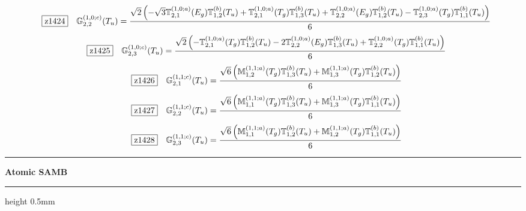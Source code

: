 \documentclass[fleqn,10pt,landscape]{jsarticle}
\begin{document}
\begin{dmath*}
\hspace*{3mm}\fbox{z1424}\quad \mathbb{G}_{2,2}^{(1,0;c)}(T_{u})=\frac{\sqrt{2} \left(- \sqrt{3} \mathbb{T}_{2,1}^{(1,0;a)}(E_{g}) \mathbb{T}_{1,2}^{(b)}(T_{u}) + \mathbb{T}_{2,1}^{(1,0;a)}(T_{g}) \mathbb{T}_{1,3}^{(b)}(T_{u}) + \mathbb{T}_{2,2}^{(1,0;a)}(E_{g}) \mathbb{T}_{1,2}^{(b)}(T_{u}) - \mathbb{T}_{2,3}^{(1,0;a)}(T_{g}) \mathbb{T}_{1,1}^{(b)}(T_{u})\right)}{6}
\end{dmath*}
\begin{dmath*}
\hspace*{3mm}\fbox{z1425}\quad \mathbb{G}_{2,3}^{(1,0;c)}(T_{u})=\frac{\sqrt{2} \left(- \mathbb{T}_{2,1}^{(1,0;a)}(T_{g}) \mathbb{T}_{1,2}^{(b)}(T_{u}) - 2 \mathbb{T}_{2,2}^{(1,0;a)}(E_{g}) \mathbb{T}_{1,3}^{(b)}(T_{u}) + \mathbb{T}_{2,2}^{(1,0;a)}(T_{g}) \mathbb{T}_{1,1}^{(b)}(T_{u})\right)}{6}
\end{dmath*}
\begin{dmath*}
\hspace*{3mm}\fbox{z1426}\quad \mathbb{G}_{2,1}^{(1,1;c)}(T_{u})=\frac{\sqrt{6} \left(\mathbb{M}_{1,2}^{(1,1;a)}(T_{g}) \mathbb{T}_{1,3}^{(b)}(T_{u}) + \mathbb{M}_{1,3}^{(1,1;a)}(T_{g}) \mathbb{T}_{1,2}^{(b)}(T_{u})\right)}{6}
\end{dmath*}
\begin{dmath*}
\hspace*{3mm}\fbox{z1427}\quad \mathbb{G}_{2,2}^{(1,1;c)}(T_{u})=\frac{\sqrt{6} \left(\mathbb{M}_{1,1}^{(1,1;a)}(T_{g}) \mathbb{T}_{1,3}^{(b)}(T_{u}) + \mathbb{M}_{1,3}^{(1,1;a)}(T_{g}) \mathbb{T}_{1,1}^{(b)}(T_{u})\right)}{6}
\end{dmath*}
\begin{dmath*}
\hspace*{3mm}\fbox{z1428}\quad \mathbb{G}_{2,3}^{(1,1;c)}(T_{u})=\frac{\sqrt{6} \left(\mathbb{M}_{1,1}^{(1,1;a)}(T_{g}) \mathbb{T}_{1,2}^{(b)}(T_{u}) + \mathbb{M}_{1,2}^{(1,1;a)}(T_{g}) \mathbb{T}_{1,1}^{(b)}(T_{u})\right)}{6}
\end{dmath*}
\vspace{5mm}

\vspace{5mm}
\noindent \rule[0.5mm]{5mm}{0.5mm}\hspace{3mm}\textbf{Atomic SAMB}\hspace{3mm}\leaders\hrule height 0.5mm\hfill\kern0pt
\vspace{3mm}

\vspace{5mm}
\end{document}
